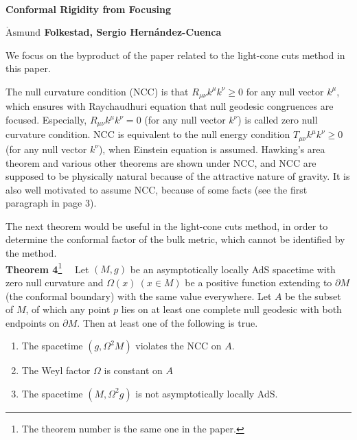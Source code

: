 \documentclass[12pt]{article}
\date{}
\renewcommand{\thefootnote}{\fnsymbol{footnote}}
\begin{document}
{\Large{}\\[2mm]
\textbf{Conformal Rigidity from Focusing\cite{Folkestad:2021kyz}
}
}

\noindent
\hfill
\textbf{$\mathring{\textrm{A}}\textrm{smund}$ Folkestad, Sergio Hern\' andez-Cuenca}%

\renewcommand{\thefootnote}{\arabic{footnote})}
\setcounter{footnote}{0}
\vspace{12pt}
We focus on the byproduct of the paper related to the light-cone cuts method \cite{Engelhardt:2016wgb,Engelhardt:2016crc,Hernandez-Cuenca:2020ppu} in this paper.

The null curvature condition (NCC) is that $R_{\mu\nu}k^\mu k^\nu \geq 0$ for any null vector $k^\mu$, 
which ensures with Raychaudhuri equation that null geodesic congruences are focused.
Especially, $R_{\mu\nu}k^\mu k^\nu = 0$ (for any null vector $k^\nu$) is called zero null curvature condition.
NCC is equivalent to the null energy condition $T_{\mu\nu}k^\mu k^\nu \geq 0$ (for any null vector $k^\nu$), 
when Einstein equation is assumed.
Hawking's area theorem and various other theorems are shown under NCC, 
and NCC are supposed to be physically natural because of the attractive nature of gravity.
It is also well motivated to assume NCC, because of some facts (see the first paragraph in page 3).

The next theorem would be useful in the light-cone cuts method, 
in order to determine the conformal factor of the bulk metric, which cannot be identified by the method.
\\[12pt]
\textbf{Theorem 4}\footnote{
The theorem number is the same one in the paper.
}~~
Let $(M,g)$ be an asymptotically locally AdS spacetime with zero null curvature and $\Omega(x)~(x\in M)$ be a positive
 function extending to $\partial M$ (the conformal boundary) with the same value everywhere.
Let $A$ be the subset of $M$, of which any point $p$ lies on at least one complete null geodesic with both endpoints on 
$\partial M$.
Then at least one of the following is true.
\begin{enumerate}
	\item The spacetime $(g,\Omega^2M)$ violates the NCC on $A$.
	\item The Weyl factor $\Omega$ is constant on $A$
	\item The spacetime $(M,\Omega^2g)$ is not asymptotically locally AdS.
\end{enumerate}
\end{document}
